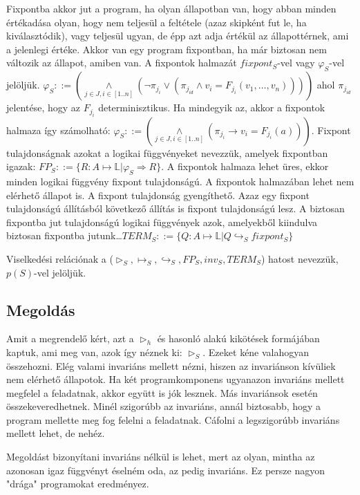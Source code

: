 \documentclass{article}
\begin{document}
Fixpontba akkor jut a program, ha olyan állapotban van, hogy abban minden értékadása olyan, hogy nem teljesül a feltétele (azaz skipként fut le, ha kiválasztódik), vagy teljesül ugyan, de épp azt adja értékül az állapottérnek, ami a jelenlegi értéke. Akkor van egy program fixpontban, ha már biztosan nem változik az állapot, amiben van. A fixpontok halmazát $fixpont_S$-vel vagy $\varphi_S$-vel jelöljük. $\varphi_S::=(\underset{j \in J, i \in [1..n]}{\land}(\neg \pi_{j_i} \lor (\pi_{j_{id}} \land v_i = F_{j_i}(v_1,\dots,v_n))))$ ahol $\pi_{j_{id}}$ jelentése, hogy az $F_{j_i}$ determinisztikus. Ha mindegyik az, akkor a fixpontok halmaza így számolható: $\varphi_S::=(\underset{j \in J, i \in [1..n]}{\land}(\pi_{j_{i}} \rightarrow v_i = F_{j_i}(a)))$. Fixpont tulajdonságnak azokat a logikai függvényeket nevezzük, amelyek fixpontban igazak: $FP_S::=\lbrace R:A \mapsto \mathbb{L} | \varphi_S \Rightarrow R \rbrace$. A fixpontok halmaza lehet üres, ekkor minden logikai függvény fixpont tulajdonságú. A fixpontok halmazában lehet nem elérhető állapot is. A fixpont tulajdonság gyengíthető. Azaz egy fixpont tulajdonságú állításból következő állítás is fixpont tulajdonságú lesz. A biztosan fixpontba jut tulajdonságú logikai függvények azok, amelyekből kiindulva biztosan fixpontba jutunk\dots $TERM_S ::= \lbrace Q:A \mapsto \mathbb{L} | Q \hookrightarrow_S fixpont_S \rbrace$

Viselkedési relációnak a ($\triangleright_S, \mapsto_S, \hookrightarrow_S, FP_S, inv_S, TERM_S$) hatost nevezzük, $p(S)$-vel jelöljük.

\subsection*{Megoldás}
Amit a megrendelő kért, azt a $\triangleright_h$ és hasonló alakú kikötések formájában kaptuk, ami meg van, azok így néznek ki: $\triangleright_S$. Ezeket kéne valahogyan összehozni. Elég valami invariáns mellett nézni, hiszen az invariánson kívüliek nem elérhető állapotok. Ha két programkomponens ugyanazon invariáns mellett megfelel a feladatnak, akkor együtt is jók lesznek. Más invariánsok esetén összekeveredhetnek. Minél szigorúbb az invariáns, annál biztosabb, hogy a program mellette meg fog felelni a feladatnak. Cáfolni a legszigorúbb invariáns mellett lehet, de nehéz.

Megoldást bizonyítani invariáns nélkül is lehet, mert az olyan, mintha az azonosan igaz függvényt éselném oda, az pedig invariáns. Ez persze nagyon "drága" programokat eredményez.
\end{document}
